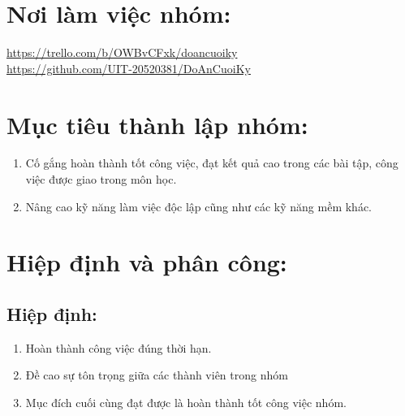 \documentclass[a4paper,14pt]{extreport}
\begin{document}
\section{Nơi làm việc nhóm:}
\url{https://trello.com/b/OWBvCFxk/doancuoiky}\\
\url{https://github.com/UIT-20520381/DoAnCuoiKy}
\section{Mục tiêu thành lập nhóm:}
\begin{enumerate}[-]
\item  Cố gắng hoàn thành tốt công việc, đạt kết quả cao trong các bài tập, công việc được giao trong môn học.
\item Nâng cao kỹ năng làm việc độc lập cũng như các kỹ năng mềm khác.
\end{enumerate}
\section{ Hiệp định và phân công:}
\subsection { Hiệp định:}
\begin{enumerate}[-]
\item Hoàn thành công việc đúng thời hạn.
\item Đề cao sự tôn trọng  giữa các thành viên trong nhóm
\item Mục đích cuối cùng đạt được là hoàn thành tốt công việc nhóm.
\end{enumerate}
\end{document}
